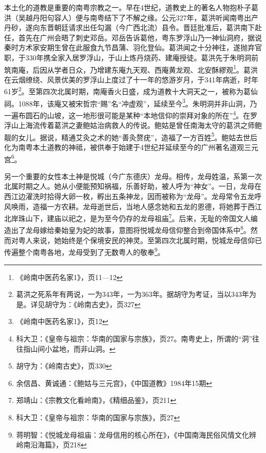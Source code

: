 本土化的道教是重要的南粤宗教之一。早在4世纪，道教史上的著名人物抱朴子葛洪（吴越丹阳句容人）便与南粤结下了不解之缘。公元327年，葛洪听闻南粤出产丹砂，遂向东晋朝廷请求出任勾漏（今广西北流）县令。晋廷批准后，葛洪南下赴任，首先在广州会晤了刺史邓岳。邓岳告诉葛他，粤东罗浮山乃一神仙洞府，据说秦时方术家安期生曾在此服食九节昌蒲、羽化登仙。葛洪闻之十分神往，遂抛弃官职，于330年携全家入居罗浮山，于山上炼丹烧药、建庵授徒。葛洪先于朱明洞前筑南庵，后因从学者日众，乃增建东庵九天观、西庵黄龙观、北安酥繆观\footnote{《岭南中医药名家1》，页11—12}。葛洪在云烟缭绕、风景优美的罗浮山上度过了十一年的悠游岁月，于341年病逝，时年61岁\footnote{葛洪之死系年有两说，一为343年，一为363年。据胡守为考证，当以343年为是。详见胡守为：《岭南古史》，页327}。至第四次北属时期，南庵香火日盛，成为道教十大洞天之一，被称为葛仙祠。1088年，该庵又被宋哲宗“赐”名“冲虚观”，延续至今\footnote{《岭南中医药名家1》，页12}。朱明洞并非山洞，乃一遍布圆石的山坡，这一地形很可能是某种“本地信仰的崇拜对象的所在”\footnote{科大卫：《皇帝与祖宗：华南的国家与宗族》，页27。南粤史上，所谓的“洞”往往指山间小盆地，而非山洞。}。在罗浮山上海流传着葛洪之妻鲍姑治病救人的传说。鲍姑是曾任南海太守的葛洪之师鲍靓的女儿。据说，精通艾灸之术的她“善灸赘疣”，造福了一方百姓\footnote{胡守为：《岭南古史》，页330}。鲍姑去世后化为南粤本土道教的神祗，被供奉于始建于4世纪并延续至今的广州著名道观三元宫\footnote{余信昌、黄诚通：《鲍姑与三元宫》，《中国道教》1984年15期}。

另一个重要的女性本土神是悦城（今广东德庆）龙母。相传，龙母姓温，系第一次北属时期之人。她从小便能预知祸福，乐善好助，被人呼为“神女”。一日，龙母在西江边濯洗时拾得大卵一枚，孵出五条神龙，因而被称为“龙母”。龙母常令五龙呼风唤雨，造福一方农耕。龙母逝世后，当地人感念她和五龙的恩德，将她葬于西江北岸珠山下，建庙以祀之，是为至今仍存的龙母祖庙\footnote{郑靖山：《宗教文化看岭南》，《精细品鉴》，页211}。后来，无耻的帝国文人编造出了龙母嫁给秦始皇为妃的故事，意图将悦城龙母信仰整合到帝国体系中\footnote{科大卫：《皇帝与祖宗：华南的国家与宗族》，页27}。然而对粤人来说，她始终是个保境安民的神灵。至第四次北属时期，悦城龙母信仰已传遍整个南粤各地，龙母受到了无数粤人的敬奉\footnote{蒋明智：《悦城龙母祖庙：龙母信用的核心所在》，《中国南海民俗风情文化辨岭南沿海篇》，页218}。

